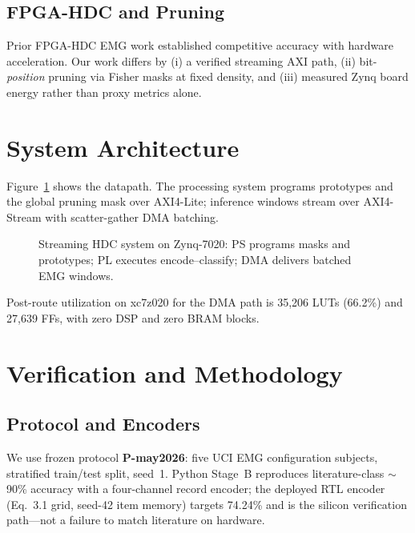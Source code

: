 \documentclass[conference]{IEEEtran}
\begin{document}
\subsection{FPGA-HDC and Pruning}
Prior FPGA-HDC EMG work established competitive accuracy with hardware acceleration.
Our work differs by (i) a verified streaming AXI path, (ii) bit-\emph{position} pruning
via Fisher masks at fixed density, and (iii) measured Zynq board energy rather than
proxy metrics alone.

\section{System Architecture}
\label{sec:arch}


Figure~\ref{fig:arch} shows the datapath.
The processing system programs prototypes and the global pruning mask over AXI4-Lite;
inference windows stream over AXI4-Stream with scatter-gather DMA batching.

\begin{figure}[t]
\centering
\caption{Streaming HDC system on Zynq-7020: PS programs masks and prototypes; PL
executes encode--classify; DMA delivers batched EMG windows.}
\label{fig:arch}
\end{figure}

Post-route utilization on xc7z020 for the DMA path is 35{,}206 LUTs (66.2\%) and
27{,}639 FFs, with zero DSP and zero BRAM blocks.

\section{Verification and Methodology}
\label{sec:method}

\subsection{Protocol and Encoders}
We use frozen protocol \textbf{P-may2026}: five UCI EMG configuration subjects,
stratified train/test split, seed~1.
Python Stage~B reproduces literature-class $\sim$90\% accuracy with a four-channel
record encoder; the deployed RTL encoder (Eq.~3.1 grid, seed-42 item memory) targets
74.24\% and is the silicon verification path---not a failure to match literature on
hardware.
\end{document}
